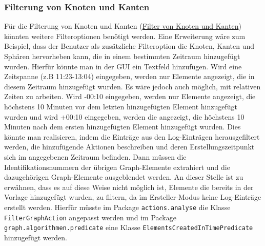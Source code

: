 \documentclass[enabledeprecatedfontcommands,fontsize=11pt,paper=a4,twoside]{scrartcl}
\newcounter{one}
\begin{document}
\subsubsection{Filterung von Knoten und Kanten}
Für die Filterung von Knoten und Kanten (\hyperlink{ss}{Filter von Knoten und Kanten}) könnten weitere Filteroptionen benötigt werden. Eine Erweiterung wäre zum Beispiel, dass der Benutzer als zusätzliche Filteroption die Knoten, Kanten und Sphären hervorheben kann, die in einem bestimmten Zeitraum hinzugefügt wurden. Hierfür könnte man in der GUI  ein Textfeld hinzufügen. Wird eine Zeitspanne (z.B 11:23-13:04) eingegeben, werden nur Elemente angezeigt, die in diesem Zeitraum hinzugefügt wurden. Es wäre jedoch auch möglich, mit relativen Zeiten zu arbeiten. Wird -00:10 eingegeben, werden nur Elemente angezeigt, die höchstens 10 Minuten vor dem letzten hinzugefügten Element hinzugefügt wurden und wird +00:10 eingegeben, werden die angezeigt, die höchstens 10 Minuten nach dem ersten hinzugefügten Element hinzugefügt wurden. Dies könnte man realisieren, indem die Einträge aus den Log-Einträgen herausgefiltert werden, die hinzufügende Aktionen beschreiben und deren Erstellungszeitpunkt sich im angegebenen Zeitraum befinden. Dann müssen die Identifikationsnummern der übrigen Graph-Elemente extrahiert und die dazugehörigen Graph-Elemente ausgeblendet werden. An dieser Stelle ist zu erwähnen, dass es auf diese Weise nicht möglich ist, Elemente die bereits in der Vorlage hinzugefügt wurden, zu filtern, da im Ersteller-Modus keine Log-Einträge erstellt werden. Hierfür müsste im Package \texttt{actions.analyse} die Klasse \texttt{FilterGraphAction} angepasst werden und im Package \texttt{graph.algorithmen.predicate} eine Klasse \texttt{ElementsCreatedInTimePredicate} hinzugefügt werden. \\
\end{document}
